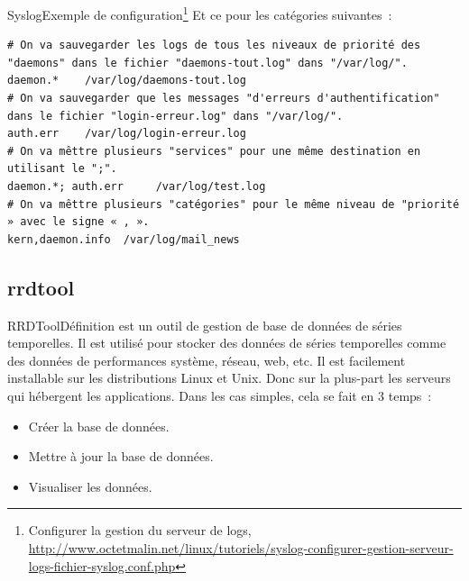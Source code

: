 \documentclass{beamer}
\begin{document}
    \begin{frame}[fragile]{Syslog}{Exemple de configuration\footnote{Configurer la gestion du serveur de logs, \url{http://www.octetmalin.net/linux/tutoriels/syslog-configurer-gestion-serveur-logs-fichier-syslog.conf.php}}}
        Et ce pour les catégories suivantes~:
        \begin{lstlisting}
# On va sauvegarder les logs de tous les niveaux de priorité des "daemons" dans le fichier "daemons-tout.log" dans "/var/log/".
daemon.*	/var/log/daemons-tout.log
# On va sauvegarder que les messages "d'erreurs d'authentification" dans le fichier "login-erreur.log" dans "/var/log/".
auth.err	/var/log/login-erreur.log
# On va mêttre plusieurs "services" pour une même destination en utilisant le ";".
daemon.*; auth.err     /var/log/test.log
# On va mêttre plusieurs "catégories" pour le même niveau de "priorité » avec le signe « , ».
kern,daemon.info  /var/log/mail_news
        \end{lstlisting}
    \end{frame}

    \subsection{rrdtool}\label{subsec:rrdtool}

    \begin{frame}{RRDTool}{Définition}
         est un outil de gestion de base de données de séries temporelles.
        \bigbreak
        Il est utilisé pour stocker des données de séries temporelles comme des données de performances système, réseau, web, etc.
        \bigbreak
        Il est facilement installable sur les distributions Linux et Unix.
        Donc sur la plus-part les serveurs qui hébergent les applications.
        \bigbreak
        Dans les cas simples, cela se fait en 3 temps~:
        \begin{itemize}
            \item Créer la base de données.
            \item Mettre à jour la base de données.
            \item Visualiser les données.
        \end{itemize}
    \end{frame}
\end{document}
